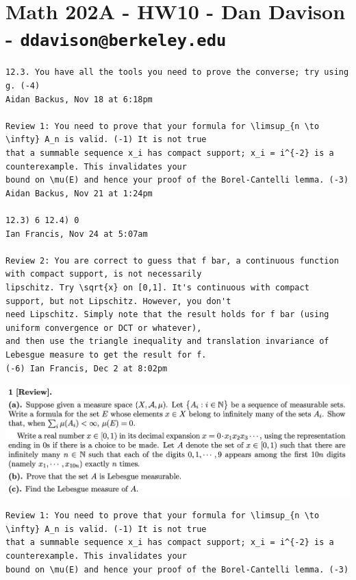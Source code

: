 \section{Math 202A - HW10 - Dan Davison - \texttt{ddavison@berkeley.edu}}

\begin{verbatim}
12.3. You have all the tools you need to prove the converse; try using g. (-4)
Aidan Backus, Nov 18 at 6:18pm

Review 1: You need to prove that your formula for \limsup_{n \to \infty} A_n is valid. (-1) It is not true
that a summable sequence x_i has compact support; x_i = i^{-2} is a counterexample. This invalidates your
bound on \mu(E) and hence your proof of the Borel-Cantelli lemma. (-3) Aidan Backus, Nov 21 at 1:24pm

12.3) 6 12.4) 0
Ian Francis, Nov 24 at 5:07am

Review 2: You are correct to guess that f bar, a continuous function with compact support, is not necessarily
lipschitz. Try \sqrt{x} on [0,1]. It's continuous with compact support, but not Lipschitz. However, you don't
need Lipschitz. Simply note that the result holds for f bar (using uniform convergence or DCT or whatever),
and then use the triangle inequality and translation invariance of Lebesgue measure to get the result for f.
(-6) Ian Francis, Dec 2 at 8:02pm
\end{verbatim}

\begin{mdframed}
  \includegraphics[width=400pt]{img/analysis--berkeley-202a-hw10-7127.png}
\end{mdframed}

\begin{verbatim}
Review 1: You need to prove that your formula for \limsup_{n \to \infty} A_n is valid. (-1) It is not true
that a summable sequence x_i has compact support; x_i = i^{-2} is a counterexample. This invalidates your
bound on \mu(E) and hence your proof of the Borel-Cantelli lemma. (-3)
\end{verbatim}

